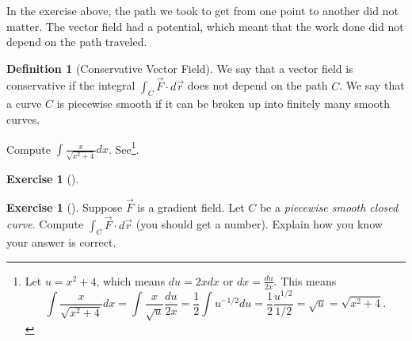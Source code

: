 \documentclass[10pt,]{book}
\theoremstyle{plain}
\theoremstyle{definition}
\newtheorem{definition}[theorem]{Definition}
\theoremstyle{definition}
\theoremstyle{definition}
\theoremstyle{definition}
\newtheorem{exploration}[project]{Exercise}
\theoremstyle{definition}
\numberwithin{equation}{section}
\newcommand{\ds}{\displaystyle}
\begin{document}
In the exercise above, the path we took to get from one point to another did not matter. The vector field had a potential, which meant that the work done did not depend on the path traveled.%
\begin{definition}[{Conservative Vector Field}]\label{definition-36}
We say that a vector field is conservative if the integral \(\int_C \vec F\cdot d\vec r\) does not depend on the path \(C\). We say that a curve \(C\) is piecewise smooth if it can be broken up into finitely many smooth curves.%
\end{definition}
Compute \(\ds \int \frac{x}{\sqrt{x^2+4}}dx\). See\footnote{Let \(u=x^2+4\), which means \(du=2xdx\) or \(dx=\frac{du}{2x}\).  This means%
\begin{equation*}
\ds \int \frac{x}{\sqrt{x^2+4}}dx 
= \int \frac{x}{\sqrt{u}}\frac{du}{2x} 
= \frac{1}{2}\int u^{-1/2}du
= \frac{1}{2}\frac{u^{1/2}}{1/2}
= \sqrt{u} = \sqrt{x^2+4}.
\end{equation*}
\label{fn-20}}.%
\begin{exploration}[]\label{exploration-209}
\end{exploration}
\begin{exploration}[]\label{exploration-210}
Suppose \(\vec F\) is a gradient field. Let \(C\) be a \emph{piecewise smooth closed curve}. Compute \(\int_C \vec F\cdot d\vec r\) (you should get a number). Explain how you know your answer is correct.%
\end{exploration}
\typeout{************************************************}
\typeout{************************************************}
\end{document}
